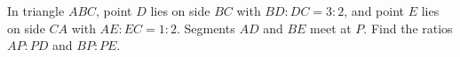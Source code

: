 In triangle $ABC$, point $D$ lies on side $BC$ with $BD:DC=3:2$, and point $E$ lies on side $CA$ with $AE:EC=1:2$. Segments $AD$ and $BE$ meet at $P$. Find the ratios $AP:PD$ and $BP:PE$.

